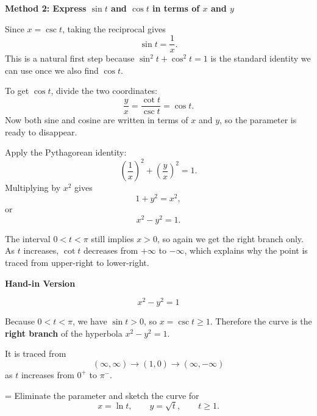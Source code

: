 \documentclass[a4paper,12pt,twocolumn]{article}
\newlength{\problemnumberwidth}
\newenvironment{solutionbox}{\begin{framed}}{\end{framed}}
\newcommand{\problem}[3]{%
  \Needspace{10\baselineskip}%
  \phantomsection\label{#1}%
  \par\vspace{0.8em}%
  \noindent
  \hangindent=\problemnumberwidth
  \hangafter=1
  \makebox[\problemnumberwidth][l]{\textbf{#2.}}#3\par
}
\begin{document}
\begin{solutionbox}
\textbf{Method 2: Express \(\sin t\) and \(\cos t\) in terms of \(x\) and \(y\)}

\begin{steps}
\item Since \(x=\csc t\), taking the reciprocal gives
\[
\sin t=\frac{1}{x}.
\]
This is a natural first step because \(\sin^2 t+\cos^2 t=1\) is the standard identity we can use once we also find \(\cos t\).

\item To get \(\cos t\), divide the two coordinates:
\[
\frac{y}{x}=\frac{\cot t}{\csc t}=\cos t.
\]
Now both sine and cosine are written in terms of \(x\) and \(y\), so the parameter is ready to disappear.

\item Apply the Pythagorean identity:
\[
\left(\frac{1}{x}\right)^2+\left(\frac{y}{x}\right)^2=1.
\]
Multiplying by \(x^2\) gives
\[
1+y^2=x^2,
\]
or
\[
x^2-y^2=1.
\]

\item The interval \(0<t<\pi\) still implies \(x>0\), so again we get the right branch only. As \(t\) increases, \(\cot t\) decreases from \(+\infty\) to \(-\infty\), which explains why the point is traced from upper-right to lower-right.
\end{steps}
\end{solutionbox}

\begin{solutionbox}
\textbf{Hand-in Version}

\[
\boxed{x^2-y^2=1}
\]

Because \(0<t<\pi\), we have \(\sin t>0\), so \(x=\csc t\ge 1\). Therefore the curve is the \textbf{right branch} of the hyperbola \(x^2-y^2=1\).

It is traced from
\[
(\infty,\infty)\to(1,0)\to(\infty,-\infty)
\]
as \(t\) increases from \(0^+\) to \(\pi^-\).
\end{solutionbox}

\problem{prob:10-1-19}{19}{Eliminate the parameter and sketch the curve for
\[
x=\ln t,\qquad y=\sqrt{t},\qquad t\ge 1.
\]}
\end{document}
